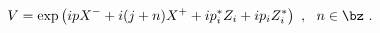 \begin{equation}
 V = \exp \left( ipX^- + 
i ( j + n ) X^+ + i p_i^* Z_i + i p_i Z_i^*\right) ~, ~~ 
 n \in \bz ~.
\end{equation}

